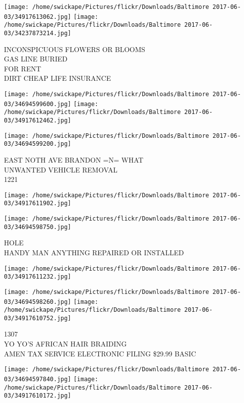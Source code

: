 \documentclass[10pt,letterpaper]{article}
\begin{document}
\texttt{[image: /home/swickape/Pictures/flickr/Downloads/Baltimore 2017-06-03/34917613062.jpg]}
\texttt{[image: /home/swickape/Pictures/flickr/Downloads/Baltimore 2017-06-03/34237873214.jpg]}

INCONSPICUOUS FLOWERS OR BLOOMS\\
GAS LINE BURIED\\
FOR RENT\\
DIRT CHEAP LIFE INSURANCE\\
\pagebreak

\texttt{[image: /home/swickape/Pictures/flickr/Downloads/Baltimore 2017-06-03/34694599600.jpg]}
\texttt{[image: /home/swickape/Pictures/flickr/Downloads/Baltimore 2017-06-03/34917612462.jpg]}

\vspace{0.25in}
\texttt{[image: /home/swickape/Pictures/flickr/Downloads/Baltimore 2017-06-03/34694599200.jpg]}

EAST NOTH AVE BRANDON =N= WHAT\\
UNWANTED VEHICLE REMOVAL\\
1221\\
\pagebreak

\texttt{[image: /home/swickape/Pictures/flickr/Downloads/Baltimore 2017-06-03/34917611902.jpg]}

\vspace{0.25in}
\texttt{[image: /home/swickape/Pictures/flickr/Downloads/Baltimore 2017-06-03/34694598750.jpg]}

HOLE\\
HANDY MAN ANYTHING REPAIRED OR INSTALLED\\
\pagebreak

\texttt{[image: /home/swickape/Pictures/flickr/Downloads/Baltimore 2017-06-03/34917611232.jpg]}

\vspace{0.25in}
\texttt{[image: /home/swickape/Pictures/flickr/Downloads/Baltimore 2017-06-03/34694598260.jpg]}
\texttt{[image: /home/swickape/Pictures/flickr/Downloads/Baltimore 2017-06-03/34917610752.jpg]}

1307\\
YO YO'S AFRICAN HAIR BRAIDING\\
AMEN TAX SERVICE ELECTRONIC FILING \$29.99 BASIC\\
\pagebreak

\texttt{[image: /home/swickape/Pictures/flickr/Downloads/Baltimore 2017-06-03/34694597840.jpg]}
\texttt{[image: /home/swickape/Pictures/flickr/Downloads/Baltimore 2017-06-03/34917610172.jpg]}
\end{document}
